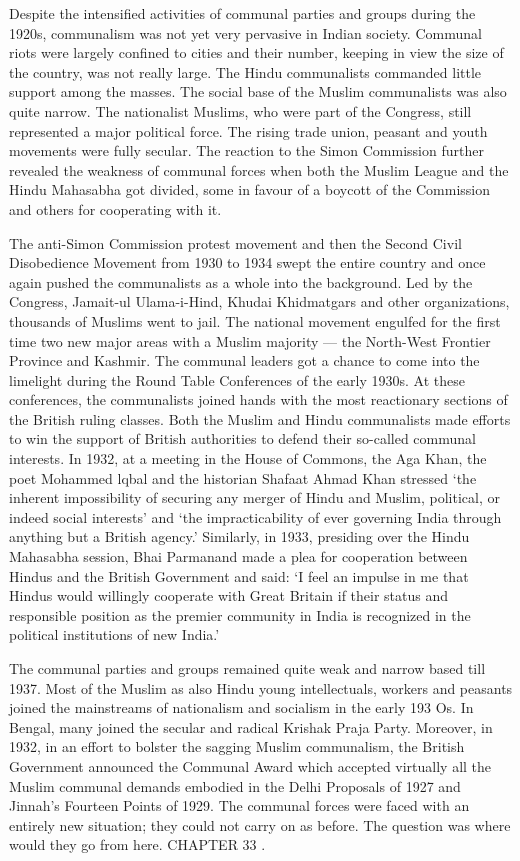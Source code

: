 Despite the intensified activities of communal parties and groups during the 1920s, communalism was not yet very pervasive in Indian society. Communal riots were largely confined to cities and their number, keeping in view the size of the country, was not really large. The Hindu communalists commanded little support among the masses. The social base of the Muslim communalists was also quite narrow. The nationalist Muslims, who were part of the Congress, still represented a major political force. The rising trade union, peasant and youth movements were fully secular. The reaction to the Simon Commission further revealed the weakness of communal forces when both the Muslim League and the Hindu Mahasabha got divided, some in favour of a boycott of the Commission and others for cooperating with it. 

The anti-Simon Commission protest movement and then the Second Civil Disobedience Movement from 1930 to 1934 swept the entire country and once again pushed the communalists as a whole into the background. Led by the Congress, Jamait-ul­ Ulama-i-Hind, Khudai Khidmatgars and other organizations, thousands of Muslims went to jail. The national movement engulfed for the first time two new major areas with a Muslim majority — the North-West Frontier Province and Kashmir. The communal leaders got a chance to come into the limelight during the Round Table Conferences of the early 1930s. At these conferences, the communalists joined hands with the most reactionary sections of the British ruling classes. Both the Muslim and Hindu communalists made efforts to win the support of British authorities to defend their so-called communal interests. In 1932, at a meeting in the House of Commons, the Aga Khan, the poet Mohammed lqbal and the historian Shafaat Ahmad Khan stressed ‘the inherent impossibility of securing any merger of Hindu and Muslim, political, or indeed social interests’ and ‘the impracticability of ever governing India through anything but a British agency.’ Similarly, in 1933, presiding over the Hindu Mahasabha session, Bhai Parmanand made a plea for cooperation between Hindus and the British Government and said: ‘I feel an impulse in me that Hindus would willingly cooperate with Great Britain if their status and responsible position as the premier community in India is recognized in the political institutions of new India.’ 

The communal parties and groups remained quite weak and narrow based till 1937. Most of the Muslim as also Hindu young intellectuals, workers and peasants joined the mainstreams of nationalism and socialism in the early 193 Os. In Bengal, many joined the secular and radical Krishak Praja Party. Moreover, in 1932, in an effort to bolster the sagging Muslim communalism, the British Government announced the Communal Award which accepted virtually all the Muslim communal demands embodied in the Delhi Proposals of 1927 and Jinnah’s Fourteen Points of 1929. The communal forces were faced with an entirely new situation; they could not carry on as before. The question was where would they go from here. CHAPTER 33 . 

